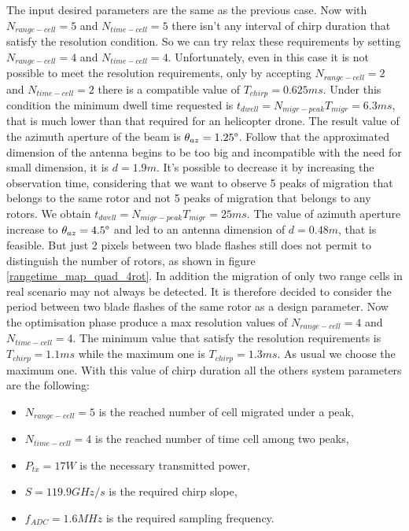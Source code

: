 The input desired parameters are the same as the previous case. Now with $N_{range-cell} = 5 $ and $N_{time-cell} = 5 $ there isn't any interval of chirp duration that satisfy the resolution condition. So we can try relax these requirements by setting $N_{range-cell} = 4 $ and $N_{time-cell} = 4 $. Unfortunately, even in this case it is not possible to meet the resolution requirements, only by accepting $N_{range-cell} = 2 $ and $N_{time-cell} = 2 $ there is a compatible value of $T_{chirp} = 0.625ms$. Under this condition the minimum dwell time requested is $t_{dwell} = N_{migr-peak} T_{migr}= 6.3 ms$, that is much lower than that required for an helicopter drone. The result value of the azimuth aperture of the beam is $\theta_{az} = 1.25\degree$. Follow that the approximated dimension of the antenna begins to be too big and incompatible with the need for small dimension, it is $d = 1.9m$. It's possible to decrease it by increasing the observation time, considering that we want to observe 5 peaks of migration that belongs to the same rotor and not 5 peaks of migration that belongs to any rotors. We obtain $t_{dwell} = N_{migr-peak} T_{migr}= 25 ms$. The value of azimuth aperture increase to $\theta_{az} = 4.5\degree$ and led to an antenna dimension of $d = 0.48m$, that is feasible. But just 2 pixels between two blade flashes still does not permit to distinguish the number of rotors, as shown in figure \ref{rangetime_map_quad_4rot}. In addition the migration of only two range cells in real scenario may not always be detected. It is therefore decided to consider the period between two blade flashes of the same rotor as a design parameter.  Now the optimisation phase produce a max resolution values of $N_{range-cell} = 4$ and $N_{time-cell} = 4$. The minimum value that satisfy the resolution requirements is $T_{chirp} = 1.1 ms$ while the maximum one is $T_{chirp} = 1.3 ms$. As usual we choose the maximum one.
With this value of chirp duration all the others system parameters are the following:

\begin{itemize}
    
    \item $N_{range-cell} = 5$ is the reached number of cell migrated under a peak,
         
    \item $N_{time-cell} = 4$ is the reached number of time cell among two peaks,

    \item $P_{tx} = 17 W$ is the necessary transmitted power,
    
    \item $S = 119.9 GHz/s$ is the required chirp slope,
    
    \item $f_{ADC} = 1.6 MHz$ is the required sampling frequency.
    
\end{itemize}


